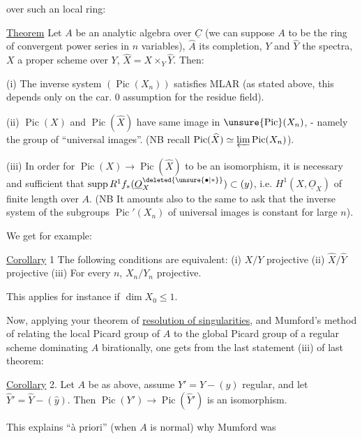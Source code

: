 
over such an local ring:

\uline{Theorem} Let $A$ be an analytic algebra over $\underline{C}$ (we can suppose $A$ to be the ring of convergent power series\deleted{\unsure{)}} in $n$ variables), $\widehat{A}$ its completion, $Y$ and $\widehat{Y}$ the spectra, $X$ a proper scheme over $Y$, $\widehat{X}=X\times_Y\widehat{Y}$. Then:

(i) The inverse system $(\operatorname{Pic}(X_n))$ satisfies MLAR (as stated above, this depends only on the car. 0 assumption for the residue field).

(ii) $\operatorname{Pic}(X)$ and $\operatorname{Pic}(\widehat{X})$ have same image in $\unsure{\operatorname{Pic}}(X_n)$, - namely the group of ``universal images''. (NB recall $\operatorname{Pic}(\widehat{X})\simeq\varprojlim\operatorname{Pic}(X_n)$).

(iii) In order for $\operatorname{Pic}(X)\longrightarrow\operatorname{Pic}(\widehat{X})$ to be an isomorphism, it is necessary and sufficient that $\operatorname{supp}R^1f_*(\underline{O}_X^{\deleted{\unsure{\bullet|*}}})\subset(y)$, i.e. $H^1(X,\underline{O}_X)$ of finite length over $A$. (NB It amounts also to the same to  ask that the inverse system of the subgroups $\operatorname{Pic}'(X_n)$ of universal images is constant for large $n$).

We get for example:

\uline{Corollary} 1 The following conditions are equivalent: (i) $X/Y$ projective (ii) $\widehat{X}/\widehat{Y}$ projective (iii) For every $n$, $X_n/Y_n$ projective.

This applies for instance if $\dim X_0\leq1$.

Now, applying your theorem of \uline{resolution of singularities}, and Mumford's method of relating the local Picard group of $A$ to the global Picard group of a regular scheme dominating $A$ birationally, one gets from the last statement  (iii) of last theorem:

\uline{Corollary} 2. Let $A$ be as above, assume  $Y'=Y-(y)$ regular, and let $\widehat{Y}'=\widehat{Y}-(\widehat{y})$. Then $\operatorname{Pic}(Y')\longrightarrow\operatorname{Pic}(\widehat{Y}')$ is an isomorphism.

This explains ``à priori'' (when $A$ is normal) why Mumford was

